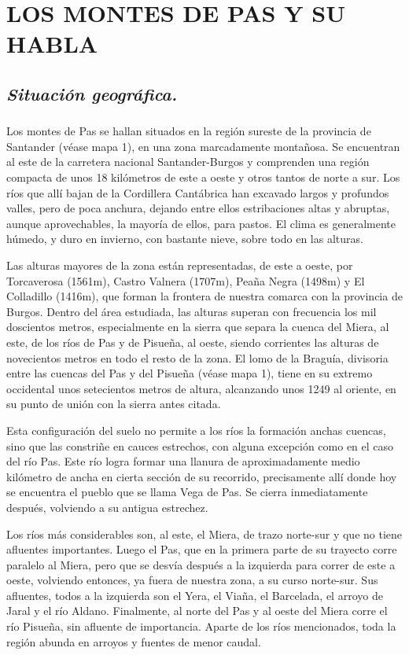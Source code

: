 \chapter{LOS MONTES DE PAS Y SU HABLA}
\section{\emph{Situación geográfica.}}
\subsection{} Los montes de Pas se hallan situados en la región sureste de la provincia de Santander (véase mapa 1), en una zona marcadamente montañosa. Se encuentran al este de la carretera nacional Santander-Burgos y comprenden una región compacta de unos 18 kilómetros de este a oeste y  otros tantos de norte a sur. Los ríos que allí bajan de la Cordillera Cantábrica han excavado largos y profundos valles, pero de poca anchura, dejando entre ellos estribaciones altas y abruptas, aunque aprovechables, la mayoría de ellos, para pastos. El clima es generalmente húmedo, y duro en invierno, con bastante nieve, sobre todo en las alturas. 

Las alturas mayores de la zona están representadas, de este a oeste, por Torcaverosa (1561m), Castro Valnera (1707m), Peaña Negra (1498m) y El Colladillo (1416m), que forman la frontera de nuestra comarca con la provincia de Burgos. Dentro del área estudiada, las alturas superan con frecuencia los mil doscientos metros, especialmente en la sierra que separa la cuenca del Miera, al este, de los ríos de Pas y de Pisueña, al oeste, siendo corrientes las alturas de novecientos metros en todo el resto de la zona. El lomo de la Braguía, divisoria entre las cuencas del Pas y del Pisueña (véase mapa 1), tiene en su extremo occidental unos setecientos metros de altura, alcanzando unos 1249 al oriente, en su punto de unión con la sierra antes citada.

Esta configuración del suelo no permite a los ríos la formación anchas cuencas, sino que las constriñe en cauces estrechos, con alguna excepción como en el caso del río Pas. Este río logra formar una llanura de aproximadamente medio kilómetro de ancha en cierta sección de su recorrido, precisamente allí donde hoy se encuentra el pueblo que se llama Vega de Pas. Se cierra inmediatamente después, volviendo a su antigua estrechez. 

Los ríos más considerables son, al este, el Miera, de trazo norte-sur y que no tiene afluentes importantes. Luego el Pas, que en la primera parte de su trayecto corre paralelo al Miera, pero que se desvía después a la izquierda para correr de este a oeste, volviendo entonces, ya fuera de nuestra zona, a su curso norte-sur. Sus afluentes, todos a la izquierda son el Yera, el Viaña, el Barcelada, el arroyo de Jaral y el río Aldano. Finalmente, al norte del Pas y al oeste del Miera corre el río Pisueña, sin afluente de importancia. Aparte de los ríos mencionados, toda la región abunda en arroyos y fuentes de menor caudal.

